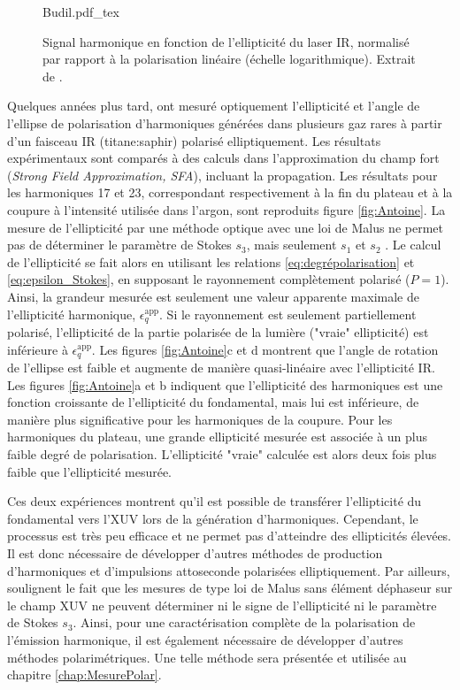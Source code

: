 \begin{figure}
\centering
\def\svgwidth{0.8\textwidth}
{Budil.pdf_tex}
\caption{Signal harmonique en fonction de l'ellipticité du laser IR, normalisé par rapport à la polarisation linéaire (échelle logarithmique). Extrait de .}
\label{fig:Budil}
\end{figure}

Quelques années plus tard,  ont mesuré optiquement l'ellipticité et l'angle de l'ellipse de polarisation d'harmoniques générées dans plusieurs gaz rares à partir d'un faisceau IR (titane:saphir) polarisé elliptiquement. Les résultats expérimentaux sont comparés à des calculs dans l'approximation du champ fort (\textit{Strong Field Approximation, SFA}), incluant la propagation. Les résultats pour les harmoniques 17 et 23, correspondant respectivement à la fin du plateau et à la coupure à l'intensité utilisée dans l'argon, sont reproduits figure \ref{fig:Antoine}. La mesure de l'ellipticité par une méthode optique avec une loi de Malus ne permet pas de déterminer le paramètre de Stokes $s_3$, mais seulement $s_1$ et $s_2$ . Le calcul de l'ellipticité se fait alors en utilisant les relations \ref{eq:degrépolarisation} et \ref{eq:epsilon_Stokes}, en supposant le rayonnement complètement polarisé ($P = 1$). Ainsi, la grandeur mesurée est seulement une valeur apparente maximale de l'ellipticité harmonique, $\epsilon_q^{\text{app}}$. Si le rayonnement est seulement partiellement polarisé, l'ellipticité de la partie polarisée de la lumière ("vraie" ellipticité) est inférieure à $\epsilon_q^{\text{app}}$. Les figures \ref{fig:Antoine}c et d montrent que l'angle de rotation de l'ellipse est faible et augmente de manière quasi-linéaire avec l'ellipticité IR. Les figures \ref{fig:Antoine}a et b indiquent que l'ellipticité des harmoniques est une fonction croissante de l'ellipticité du fondamental, mais lui est inférieure, de manière plus significative pour les harmoniques de la coupure. Pour les harmoniques du plateau, une grande ellipticité mesurée est associée à un plus faible degré de polarisation. L'ellipticité "vraie" calculée est alors deux fois plus faible que l'ellipticité mesurée.

Ces deux expériences montrent qu'il est possible de transférer l'ellipticité du fondamental vers l'XUV lors de la génération d'harmoniques. Cependant, le processus est très peu efficace et ne permet pas d'atteindre des ellipticités élevées. Il est donc nécessaire de développer d'autres méthodes de production d'harmoniques et d'impulsions attoseconde polarisées elliptiquement. Par ailleurs,  soulignent le fait que les mesures de type loi de Malus sans élément déphaseur sur le champ XUV ne peuvent déterminer ni le signe de l'ellipticité ni le paramètre de Stokes $s_3$. Ainsi, pour une caractérisation complète de la polarisation de l'émission harmonique, il est également nécessaire de développer d'autres méthodes polarimétriques. Une telle méthode sera présentée et utilisée au chapitre \ref{chap:MesurePolar}.



